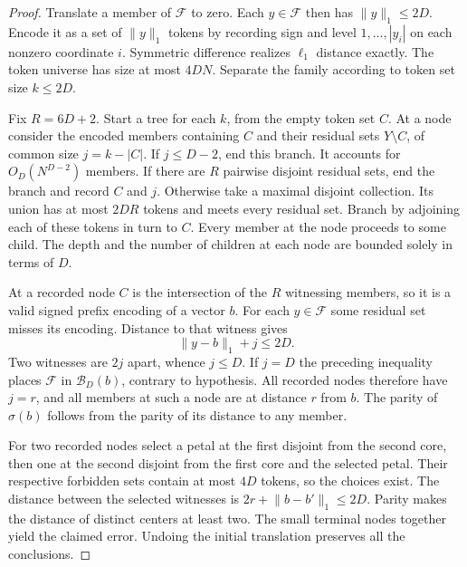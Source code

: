 \documentclass[10pt]{article}
\newcommand{\F}{\mathcal F}
\newcommand{\s}{\sigma}
\newcommand{\B}{\mathcal B}
\newcommand{\norm}[1]{\lVert #1\rVert_1}
\begin{document}
\begin{proof}
Translate a member of $\F$ to zero. Each $y\in\F$ then has $\norm y\le2D$. Encode it as a set of $\norm y$ tokens by recording sign and level $1,\ldots,|y_i|$ on each nonzero coordinate $i$. Symmetric difference realizes $\ell_1$ distance exactly. The token universe has size at most $4DN$. Separate the family according to token set size $k\le2D$.

Fix $R=6D+2$. Start a tree for each $k$, from the empty token set $C$. At a node consider the encoded members containing $C$ and their residual sets $Y\setminus C$, of common size $j=k-|C|$. If $j\le D-2$, end this branch. It accounts for $O_D(N^{D-2})$ members. If there are $R$ pairwise disjoint residual sets, end the branch and record $C$ and $j$. Otherwise take a maximal disjoint collection. Its union has at most $2DR$ tokens and meets every residual set. Branch by adjoining each of these tokens in turn to $C$. Every member at the node proceeds to some child. The depth and the number of children at each node are bounded solely in terms of $D$.

At a recorded node $C$ is the intersection of the $R$ witnessing members, so it is a valid signed prefix encoding of a vector $b$. For each $y\in\F$ some residual set misses its encoding. Distance to that witness gives
\[
 \norm{y-b}+j\le 2D.
\]
Two witnesses are $2j$ apart, whence $j\le D$. If $j=D$ the preceding inequality places $\F$ in $\B_D(b)$, contrary to hypothesis. All recorded nodes therefore have $j=r$, and all members at such a node are at distance $r$ from $b$. The parity of $\s(b)$ follows from the parity of its distance to any member.

For two recorded nodes select a petal at the first disjoint from the second core, then one at the second disjoint from the first core and the selected petal. Their respective forbidden sets contain at most $4D$ tokens, so the choices exist. The distance between the selected witnesses is $2r+\norm{b-b'}\le2D$. Parity makes the distance of distinct centers at least two. The small terminal nodes together yield the claimed error. Undoing the initial translation preserves all the conclusions.
\end{proof}
\end{document}
